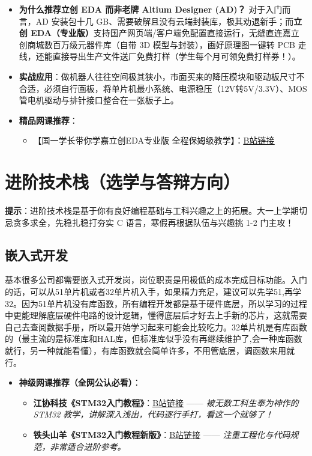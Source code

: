 \documentclass[a4paper,11pt,oneside]{scrreprt}
\begin{document}
\begin{itemize}
    \item \textbf{为什么推荐立创 EDA 而非老牌 Altium Designer (AD)？}
    对于入门而言，AD 安装包十几 GB、需要破解且没有云端封装库，极其劝退新手；而\textbf{立创 EDA（专业版）}支持国产网页端/客户端免配置直接运行，无缝直连嘉立创商城数百万级元器件库（自带 3D 模型与封装），画好原理图一键转 PCB 走线，还能直接导出生产文件送厂免费打样（学生每个月可领免费打样券！）。
    \item \textbf{实战应用}：做机器人往往空间极其狭小，市面买来的降压模块和驱动板尺寸不合适，必须自行画板，将单片机最小系统、电源稳压（12V转5V/3.3V）、MOS管电机驱动与排针接口整合在一张板子上。
    \item \textbf{精品网课推荐}：
    \begin{itemize}
        \item 【国一学长带你学嘉立创EDA专业版 全程保姆级教学】：\href{https://www.bilibili.com/video/BV1At421h7Ui/}{\underline{B站链接}}
    \end{itemize}
\end{itemize}

\section{进阶技术栈（选学与答辩方向）}

\begin{ctbox}
\textbf{提示}：进阶技术栈是基于你有良好编程基础与工科兴趣之上的拓展。大一上学期切忌贪多求全，先稳扎稳打夯实 C 语言，寒假再根据队伍与兴趣挑 1-2 门主攻！
\end{ctbox}

\subsection{嵌入式开发}

基本很多公司都需要嵌入式开发岗，岗位职责是用极低的成本完成目标功能。入门的话，可以从51单片机或者32单片机入手，如果精力充足，建议可以先学51,再学32。因为51单片机没有库函数，所有编程开发都是基于硬件底层，所以学习的过程中更能理解底层硬件电路的设计逻辑，懂得底层后才好去上手新的芯片，这就需要自己去查阅数据手册，所以最开始学习起来可能会比较吃力。32单片机是有库函数的（最主流的是标准库和HAL库，但标准库似乎没有再继续维护了,会一种库函数就行，另一种就能看懂），有库函数就会简单许多，不用管底层，调函数来用就行。

\begin{itemize}
    \item \textbf{神级网课推荐（全网公认必看）}：
    \begin{itemize}
        \item \textbf{江协科技《STM32入门教程》}：\href{https://www.bilibili.com/video/BV1th411z7sn/}{\underline{B站链接}} —— \textit{被无数工科生奉为神作的 STM32 教学，讲解深入浅出，代码逐行手打，看这一个就够了！}
        \item \textbf{铁头山羊《STM32入门教程新版》}：\href{https://www.bilibili.com/video/BV11X4y1j7si/}{\underline{B站链接}} —— \textit{注重工程化与代码规范，非常适合进阶参考。}
    \end{itemize}
\end{itemize}
\end{document}
